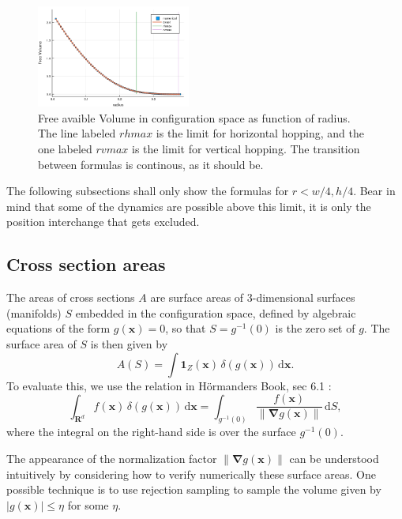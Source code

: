\documentclass[superscriptaddress,pre,reprint,showpacs,onecolumn]{revtex4-1}
\newcommand{\indicatorsymbol}{\mathbf{1}}
\begin{document}
\begin{figure}[h]
\centering
\includegraphics[width=0.45\textwidth]{./figures/FreeVolume01.png}
\caption{Free avaible Volume in configuration space as function of radius. The
  line labeled $rhmax$ is the limit for horizontal hopping, and the one labeled
  $rvmax$ is the limit for vertical hopping. The transition between formulas
is continous, as it should be.}\label{VolMonteC}%
\end{figure}


The following subsections shall only show the formulas for $r<w/4, h/4$.
Bear in mind that some of the dynamics are possible above this limit,
it is only the position interchange that gets excluded. \\




\subsection{Cross section areas}\label{areahop}

The areas of cross sections $A$ are surface areas of 3-dimensional surfaces (manifolds) $S$ embedded in the configuration space,
defined by algebraic equations of the form $g(\mathbf{x}) = 0$, so that $S = g^{-1}(0)$ is the zero set of $g$.
The surface area of $S$ is then given by
\begin{equation}
A(S) = \int \indicatorsymbol_Z(\mathbf{x}) \, \delta(g(\mathbf{x})) \, \mathrm{d} \mathbf{x}.
\label{eq:surface-area}
\end{equation}
To evaluate this, we use the relation in H\"ormanders Book, sec 6.1 \cite{Hormander83}:
\begin{equation}
\int_{\mathbf{R}^d} f(\mathbf{x}) \, \delta(g(\mathbf{x})) \, \mathrm{d} \mathbf{x} = \int_{g^{-1}(0)}\frac{f(\mathbf{x})}{\| \mathbf{\nabla}g(\mathbf{x}) \|} \, \mathrm{d}S,
\label{eq:surface-dirac}
\end{equation}
where the integral on the right-hand side is over the surface $g^{-1}(0)$.

The appearance of the normalization factor $\| \mathbf{\nabla}g(\mathbf{x}) \|$ can be understood intuitively by considering how to verify numerically these surface areas. One possible technique is to use rejection sampling to sample the volume given by $|g(\mathbf{x})| \le \eta$ for some $\eta$.
\end{document}
